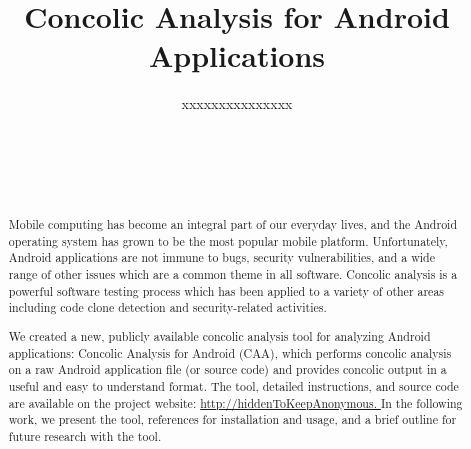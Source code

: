 \documentclass{sig-alternate}
\newif\ifisnopii
\begin{document}
\title{Concolic Analysis for Android Applications}



\ifisnopii %
\author{
%
\alignauthor
Daniel~E.~Krutz, Patrick McAfee, \&~Samuel~A.~Malachowsky\\ 	
	\affaddr{Software Engineering Department}\\
       \affaddr{Rochester Institute of Technology}\\
       \affaddr{1 Lomb Memorial Drive}\\
       \affaddr{Rochester, NY, USA} \\
       \email{\{dxkvse, pjm4439, samvse\}@rit.edu}
       \alignauthor
} %

\else %
\author{
%
\alignauthor
xxxxxxxxxxxxxxx\\ 	
	\\
       \\
       \\
        \\
       \alignauthor
} %
\fi %

\maketitle

\begin{abstract}
Mobile computing has become an integral part of our everyday lives, and the Android operating system has grown to be the most popular mobile platform. Unfortunately, Android applications are not immune to bugs, security vulnerabilities, and a wide range of other issues which are a common theme in all software. Concolic analysis is a powerful software testing process which has been applied to a variety of other areas including code clone detection and security-related activities.

We created a new, publicly available concolic analysis tool for analyzing Android applications: Concolic Analysis for Android (CAA), which performs concolic analysis on a raw Android application file (or source code) and provides concolic output in a useful and easy to understand format. The tool, detailed instructions, and source code are available on the project website: \ifisnopii \url{http://darwin.rit.edu/caa/} \else \url{http://hiddenToKeepAnonymous. } \fi In the following work, we present the tool, references for installation and usage, and a brief outline for future research with the tool.

\end{abstract}
\end{document}
